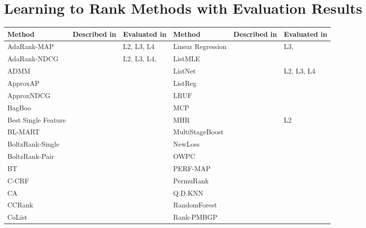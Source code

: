 \documentclass{sig-alternate-2013}
\begin{document}
\section{Learning to Rank Methods with Evaluation Results}
\label{app:ltr_methods_used}
\begin{table}[!hp]
\begin{tabular}{lll|lll}\toprule
Method & Described in & Evaluated in & Method & Described in & Evaluated in\\
\midrule
AdaRank-MAP & \cite{Xu2007} & L2, L3, L4 & Linear Regression & \cite{Cossock2006} & L3, \cite{Wang2012, Volkovs2011} \\ 
AdaRank-NDCG & \cite{Xu2007} & L2, L3, L4,  \cite{Busa-Fekete2013,Tan2013} & ListMLE & \cite{Xia2008} & \cite{Lin2010, Lin2011, Gao2014} \\ 
ADMM & \cite{Duh2011} & \cite{Duh2011} & ListNet & \cite{Cao2007} & L2, L3, L4 \\ 
ApproxAP & \cite{Qin2010b} & \cite{Qin2010b} & ListReg & \cite{Wu2011} & \cite{Wu2011} \\ 
ApproxNDCG & \cite{Qin2010b} & \cite{Qin2010b} & LRUF & \cite{Torkestani2012b} & \cite{Torkestani2012b} \\ 
BagBoo & \cite{Pavlov2010} & \cite{Ganjisaffar2011c} & MCP & \cite{Laporte2013} & \cite{Laporte2013} \\ 
Best Single Feature &  & \cite{Gomes2013} & MHR & \cite{Qin2007} & L2 \\ 
BL-MART & \cite{Ganjisaffar2011c} & \cite{Ganjisaffar2011c} & MultiStageBoost & \cite{Kao2013} & \cite{Kao2013} \\ 
BoltzRank-Single & \cite{Volkovs2009} & \cite{Volkovs2009, Volkovs2013} & NewLoss & \cite{Peng2010} & \cite{Peng2010} \\ 
BoltzRank-Pair & \cite{Volkovs2009} & \cite{Volkovs2009, Ganjisaffar2011c, Volkovs2013} & OWPC & \cite{Usunier2009} & \cite{Usunier2009} \\ 
BT & \cite{Zhou2008} & \cite{Zhou2008} & PERF-MAP & \cite{Pan2011} & \cite{Torkestani2012b} \\ 
C-CRF & \cite{Qin2008b} & \cite{Qin2008b} & PermuRank & \cite{Xu2008} & \cite{Xu2008} \\ 
CA & \cite{Metzler2007} & \cite{Busa-Fekete2013,Tan2013} & Q.D.KNN & \cite{Geng2008} & \cite{Wang2013} \\ 
CCRank & \cite{Wang2011c} & \cite{Wang2011c} & RandomForest &  & \cite{Gomes2013} \\ 
CoList & \cite{Gao2014} & \cite{Gao2014} & Rank-PMBGP & \cite{Sato2013} & \cite{Sato2013} \\ 

\end{tabular}
\end{table}
\end{document}
